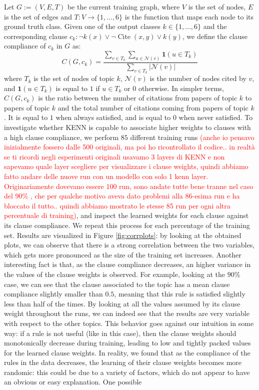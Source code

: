 \begin{definition}
	Let $G:=(V,E,T)$ be the current training graph, where $V$ is the set of nodes, $E$ is the set of edges and $T:V\rightarrow \{1,\dots,6\}$ is the function that maps each node to its ground truth class.
	Given one of the output classes $k\in\{1,\dots,6\}$ and the corresponding clause $c_k: \neg k(x) \vee \neg \operatorname{Cite}(x,y) \vee k(y)$, we define the clause compliance of $c_k$ in $G$ as:
	\begin{equation}
	 C(G,c_k) = \frac{\sum_{v \in T_k} \sum_{u \in \mathcal{N}(v)}\mathbf{1}(u\in T_k)}{\sum_{v\in T_k}|\mathcal{N}(v)|}
	\end{equation}
	where $T_k$ is the set of nodes of topic $k$, $\mathcal{N}(v)$ is the number of nodes cited by $v$, and $\mathbf{1}(u\in T_k)$ is equal to $1$ if $u\in T_k$ or $0$ otherwise. In simpler terms, $C(G,c_k)$ is the ratio between the number of citations from papers of topic $k$ to papers of topic $k$ and the total number of citations coming from papers of topic $k$. It is equal to $1$ when always satisfied, and is equal to $0$ when never satisfied. To investigate whether KENN is capable to associate higher weights to clauses with a high clause compliance, we perform $85$ different training runs \textcolor{red}{(anche io pensavo inizialmente fossero dalle 500 originali, ma poi ho ricontrollato il codice.. in realtà se ti ricordi negli esperimenti originali usavamo 3 layers di KENN e non sapevamo quale layer scegliere per visualizzare i clause weights, quindi abbiamo fatto andare delle nuove run con un modello con solo 1 kenn layer. Originariamente dovevano essere 100 run, sono andate tutte bene tranne nel caso del 90\% , che per qualche motivo aveva dato problemi alla 86-esima run e ha bloccato il tutto.. quindi abbiamo mostrato le stesse 85 run per ogni altra percentuale di training)}, and inspect the learned weights for each clause against its clause compliance. We repeat this process for each percentage of the training set. Results are visualized in Figure \ref{fig:corrplots}: by looking at the obtained plots, we can observe that there is a strong correlation between the two variables, which gets more pronounced as the size of the training set increases. Another interesting fact is that, as the clause compliance decreases, an higher variance in the values of the clause weights is observed. For example, looking at the $90\%$ case, we can see that the clause associated to the topic  has a mean clause compliance slightly smaller than $0.5$, meaning that this rule is satisfied slightly less than half of the times. By looking at all the values assumed by its clause weight throughout the runs, we can indeed see that the results are very variable with respect to the other topics. This behavior goes against our intuition in some way: if a rule is not useful (like in this case), then the clause weights should monotonically decrease during training, leading to low and tightly packed values for the learned clause weights. In reality, we found that as the compliance of the rules in the data decreases, the learning of their clause weights becomes more randomic: this could be due to a variety of factors, which do not appear to have an obvious or easy explanation. One possible 
\end{definition}
